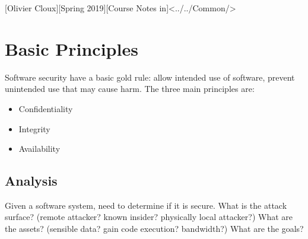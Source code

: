 \documentclass[11pt,a4paper]{article}
\begin{document}
[Olivier Cloux][Spring 2019][Course Notes in]<../../Common/>
\tableofcontents
\newpage
\section{Basic Principles}
Software security have a basic gold rule: allow intended use of software, prevent unintended use that may cause harm. The three main principles are: 
\begin{itemize}
    \item Confidentiality
    \item Integrity
    \item Availability
\end{itemize}
\subsection{Analysis}
Given a software system, need to determine if it is secure. What is the attack surface? (remote attacker? known insider? physically local attacker?) What are the assets? (sensible data? gain code execution? bandwidth?) What are the goals?
\end{document}
